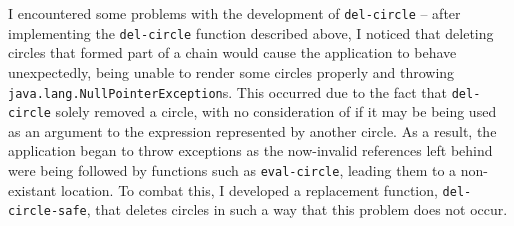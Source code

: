 \documentclass[12pt,twoside,notitlepage,xetex]{report}
\begin{document}
I encountered some problems with the development of \verb¬del-circle¬ -- after
implementing the \verb¬del-circle¬ function described above, I noticed that
deleting circles that formed part of a chain would cause the application to
behave unexpectedly, being unable to render some circles properly and throwing
\verb¬java.lang.NullPointerException¬s.  This occurred due to the fact that
\verb¬del-circle¬ solely removed a circle, with no consideration of if it may
be being used as an argument to the expression represented by another circle.
As a result, the application began to throw exceptions as the now-invalid
references left behind were being followed by functions such as
\verb¬eval-circle¬, leading them to a non-existant location.  To combat this, I
developed a replacement function, \verb¬del-circle-safe¬, that deletes circles
in such a way that this problem does not occur.
\end{document}
